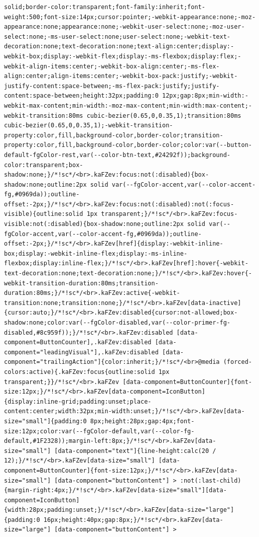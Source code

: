 \documentclass[
  letterpaper,
]{book}
\begin{document}
\begin{verbatim}
solid;border-color:transparent;font-family:inherit;font-weight:500;font-size:14px;cursor:pointer;-webkit-appearance:none;-moz-appearance:none;appearance:none;-webkit-user-select:none;-moz-user-select:none;-ms-user-select:none;user-select:none;-webkit-text-decoration:none;text-decoration:none;text-align:center;display:-webkit-box;display:-webkit-flex;display:-ms-flexbox;display:flex;-webkit-align-items:center;-webkit-box-align:center;-ms-flex-align:center;align-items:center;-webkit-box-pack:justify;-webkit-justify-content:space-between;-ms-flex-pack:justify;justify-content:space-between;height:32px;padding:0 12px;gap:8px;min-width:-webkit-max-content;min-width:-moz-max-content;min-width:max-content;-webkit-transition:80ms cubic-bezier(0.65,0,0.35,1);transition:80ms cubic-bezier(0.65,0,0.35,1);-webkit-transition-property:color,fill,background-color,border-color;transition-property:color,fill,background-color,border-color;color:var(--button-default-fgColor-rest,var(--color-btn-text,#24292f));background-color:transparent;box-shadow:none;}/*!sc*/<br>.kaFZev:focus:not(:disabled){box-shadow:none;outline:2px solid var(--fgColor-accent,var(--color-accent-fg,#0969da));outline-offset:-2px;}/*!sc*/<br>.kaFZev:focus:not(:disabled):not(:focus-visible){outline:solid 1px transparent;}/*!sc*/<br>.kaFZev:focus-visible:not(:disabled){box-shadow:none;outline:2px solid var(--fgColor-accent,var(--color-accent-fg,#0969da));outline-offset:-2px;}/*!sc*/<br>.kaFZev[href]{display:-webkit-inline-box;display:-webkit-inline-flex;display:-ms-inline-flexbox;display:inline-flex;}/*!sc*/<br>.kaFZev[href]:hover{-webkit-text-decoration:none;text-decoration:none;}/*!sc*/<br>.kaFZev:hover{-webkit-transition-duration:80ms;transition-duration:80ms;}/*!sc*/<br>.kaFZev:active{-webkit-transition:none;transition:none;}/*!sc*/<br>.kaFZev[data-inactive]{cursor:auto;}/*!sc*/<br>.kaFZev:disabled{cursor:not-allowed;box-shadow:none;color:var(--fgColor-disabled,var(--color-primer-fg-disabled,#8c959f));}/*!sc*/<br>.kaFZev:disabled [data-component=ButtonCounter],.kaFZev:disabled [data-component="leadingVisual"],.kaFZev:disabled [data-component="trailingAction"]{color:inherit;}/*!sc*/<br>@media (forced-colors:active){.kaFZev:focus{outline:solid 1px transparent;}}/*!sc*/<br>.kaFZev [data-component=ButtonCounter]{font-size:12px;}/*!sc*/<br>.kaFZev[data-component=IconButton]{display:inline-grid;padding:unset;place-content:center;width:32px;min-width:unset;}/*!sc*/<br>.kaFZev[data-size="small"]{padding:0 8px;height:28px;gap:4px;font-size:12px;color:var(--fgColor-default,var(--color-fg-default,#1F2328));margin-left:8px;}/*!sc*/<br>.kaFZev[data-size="small"] [data-component="text"]{line-height:calc(20 / 12);}/*!sc*/<br>.kaFZev[data-size="small"] [data-component=ButtonCounter]{font-size:12px;}/*!sc*/<br>.kaFZev[data-size="small"] [data-component="buttonContent"] > :not(:last-child){margin-right:4px;}/*!sc*/<br>.kaFZev[data-size="small"][data-component=IconButton]{width:28px;padding:unset;}/*!sc*/<br>.kaFZev[data-size="large"]{padding:0 16px;height:40px;gap:8px;}/*!sc*/<br>.kaFZev[data-size="large"] [data-component="buttonContent"] > 
\end{verbatim}
\end{document}
